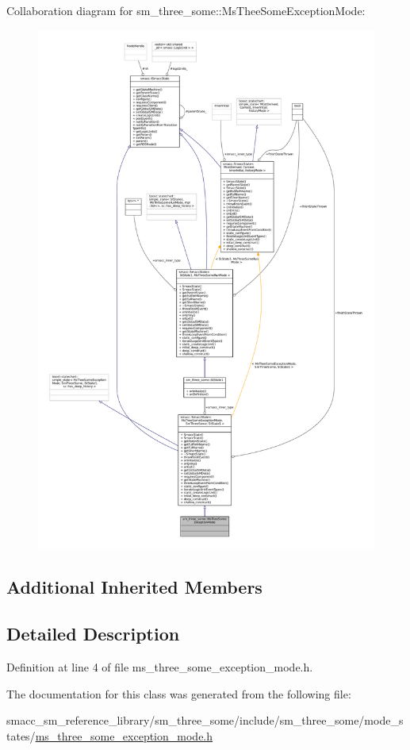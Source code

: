 Collaboration diagram for sm\+\_\+three\+\_\+some\+:\+:Ms\+Thee\+Some\+Exception\+Mode\+:
\nopagebreak
\begin{figure}[H]
\begin{center}
\leavevmode
\includegraphics[width=350pt]{classsm__three__some_1_1MsTheeSomeExceptionMode__coll__graph}
\end{center}
\end{figure}
\subsection*{Additional Inherited Members}


\subsection{Detailed Description}


Definition at line 4 of file ms\+\_\+three\+\_\+some\+\_\+exception\+\_\+mode.\+h.



The documentation for this class was generated from the following file\+:\begin{DoxyCompactItemize}
\item 
smacc\+\_\+sm\+\_\+reference\+\_\+library/sm\+\_\+three\+\_\+some/include/sm\+\_\+three\+\_\+some/mode\+\_\+states/\hyperlink{ms__three__some__exception__mode_8h}{ms\+\_\+three\+\_\+some\+\_\+exception\+\_\+mode.\+h}\end{DoxyCompactItemize}

